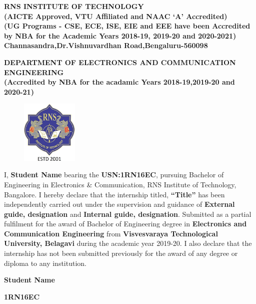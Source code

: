 %
\setlength{\toptafiddle}{1in}
\setlength{\bottafiddle}{1in}
\vspace*{-0.5in}
\enlargethispage{\bottafiddle}
\thispagestyle{empty}


\begin{center}
\small\textbf{\color{blue}	RNS INSTITUTE OF TECHNOLOGY\\
(AICTE Approved, VTU Affiliated and NAAC `A' Accredited)\\
(UG Programs - CSE, ECE, ISE, EIE and EEE have been Accredited by NBA for the Academic Years 2018-19, 2019-20 and 2020-2021)\\
Channasandra,Dr.Vishnuvardhan Road,Bengaluru-560098}\\
\vspace{0.3cm}

\small\textbf{DEPARTMENT OF ELECTRONICS AND COMMUNICATION ENGINEERING\\
(Accredited by NBA for the acadamic Years 2018-19,2019-20 and 2020-21)
}
\end{center}

\begin{center}
\begin{figure}[h]
\centering
\includegraphics[height=3cm]{images/rns1.jpg}
\end{figure}
\Large{\textbf{\color{red}{DECLARATION}}}
\end{center}

I, \textbf{Student Name} bearing the \textbf{USN:1RN16EC}, pursuing Bachelor of\\ Engineering in Electronics \& Communication, RNS Institute of Technology, Bangalore. I hereby declare that the internship titled, \textbf{“Title”} has been independently carried out under the supervision and guidance of \textbf{External guide, designation} and \textbf{Internal guide, designation}. Submitted as a partial fulfilment for the award of Bachelor of Engineering degree in \textbf{\color{blue}Electronics and Communication Engineering} from \textbf{\color{blue}Visvesvaraya Technological University, Belagavi} during the academic year 2019-20. I also declare that the internship has not been submitted previously for the award of any degree or diploma to any institution.


\vspace{1.5cm}

\begin{flushright}\textbf{Student Name}\end{flushright}
\begin{flushright}\small\textbf{1RN16EC}\end{flushright}
